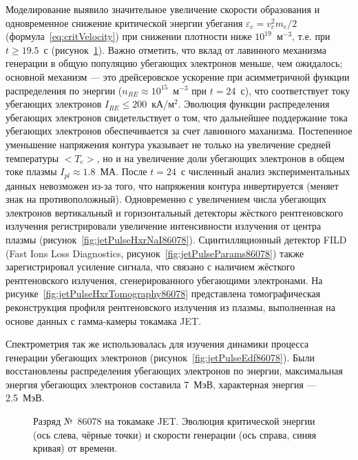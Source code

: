 Моделирование выявило значительное увеличение скорости образования и одновременное снижение критической энергии убегания $\varepsilon_c = v_c^2 m_e /2$ (формула~\ref{eq:critVelocity}) при снижении плотности ниже $10^{19}$~м${}^{-3}$, т.е. при $t \ge 19.5$~с (рисунок~\ref{fig:jetPulseCriticalEnergy86078}). Важно отметить, что вклад от лавинного механизма генерации в общую популяцию убегающих электронов меньше, чем ожидалось; основной механизм --- это дрейсеровское ускорение при асимметричной функции распределения по энергии ($n_{RE} \approx 10^{15}$~м${}^{-3}$ при $t = 24$~с), что соответствует току убегающих электронов $I_{RE} \le 200$~кА/м${}^2$. Эволюция функции распределения убегающих электронов свидетельствует о том, что дальнейшее поддержание тока убегающих электронов обеспечивается за счет лавинного маханизма. Постепенное уменьшение напряжения контура указывает не только на увеличение средней температуры $<T_e>$, но и на увеличение доли убегающих электронов в общем токе плазмы $I_{pl} \approx 1.8$~МА. 
После $t = 24$~с численный анализ экспериментальных данных невозможен из-за того, что напряжения контура инвертируется (меняет знак на противоположный). Одновременно с увеличением числа убегающих электронов вертикальный и горизонтальный детекторы жёсткого рентгеновского излучения регистрировали увеличение интенсивности излучения от центра плазмы (рисунок~\ref{fig:jetPulseHxrNaI86078}). Сцинтилляционный детектор FILD (Fast Ions Loss Diagnostics, рисунок~\ref{fig:jetPulseParams86078}) также зарегистрировал усиление сигнала, что связано с наличием жёсткого рентгеновского излучения, сгенерированного убегающими электронами. На рисунке~\ref{fig:jetPulseHxrTomography86078} представлена томографическая реконструкция профиля рентгеновского излучения из плазмы, выполненная на основе данных с гамма-камеры токамака JET.

Спектрометрия так же использовалась для изучения динамики процесса генерации убегающих электронов (рисунок~\ref{fig:jetPulseEdf86078}). Были восстановлены распределения убегающих электронов по энергии, максимальная энергия убегающих электронов составила 7~МэВ, характерная энергия --- 2.5~МэВ.

\begin{figure}[ht!]
  \caption{ Разряд №~86078 на токамаке JET. Эволюция критической энергии (ось слева, чёрные точки) и скорости генерации (ось справа, синяя кривая) от времени.~\cite{Plyusnin2015} }
  \label{fig:jetPulseCriticalEnergy86078}
\end{figure}

